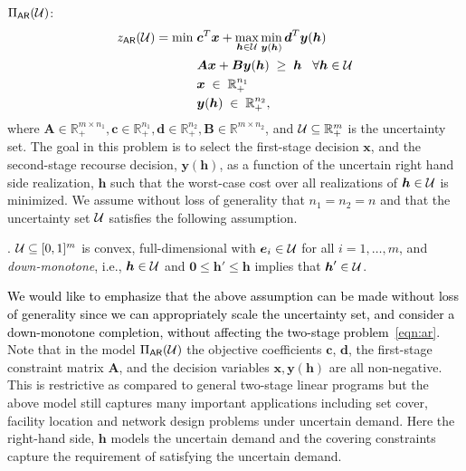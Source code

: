 \documentclass[11pt]{article}
\theoremstyle{plain}
\theoremstyle{definition}
\numberwithin{equation}{section}%
\numberwithin{equation}{section}%
\newcommand{\mb}[1]{\ensuremath{\boldsymbol{#1}}}
\newcommand*{\red}{\textcolor{black}}
\begin{document}
\medskip

\noindent
$\Pi_{\sf AR}({\cal U})$:
\begin{equation}\label{eqn:ar}
\begin{aligned}
z_{\sf AR}({\cal U}) = \min \; & \mb{c}^T \mb{x} + \max_{\mb{h}\in {\cal U}} \min_{\mb{y}(\mb{h})} \mb{d}^T \mb{y}(\mb{h}) \\
&  \mb{A}\mb{x} + \mb{B}\mb{y}(\mb{h}) \; \geq \; \mb{h}   \; \; \; \forall \mb h \in {\cal U}  \\
 & \mb{x} \; \in \; {\mathbb R}^{n_1}_+\\
 & \mb{y}(\mb{h})  \; \in \; {\mathbb R}^{n_2}_+,
\end{aligned}
\end{equation}
where $\mb{A} \in {\mathbb R}_+^{m {\times} n_1}, \mb{c}\in {\mathbb R}^{n_1}_+, \mb{d}\in {\mathbb R}^{n_2}_+, \mb{B} \in {\mathbb R}^{m {\times} n_2}$, and ${\cal U}\subseteq{\mathbb R}^m_+$ is the uncertainty set. The goal in this problem is to select the first-stage decision $\mb{x}$, and the second-stage recourse decision,  $\mb y(\mb{h})$, as a function of the uncertain right hand side realization, $\mb{h}$ such that the worst-case cost over all realizations of $\mb h \in {\cal U}$ is minimized. We assume without loss of generality that $n_1 = n_2 = n$ and that the uncertainty set ${\cal U}$ satisfies the following assumption.

\vspace{2mm}
. ${\cal U}\subseteq [0,1]^m$  is convex, full-dimensional with $\mb{e}_i \in {\cal U}$ for all $i =1,\ldots,m$, and  {\em down-monotone}, i.e.,  $\mb{h}\in{\cal U}$ and $\mb{0}\leq \mb{h}' \leq\mb{h}$ implies that $\mb{h}' \in{\cal U}$.

\vspace{2mm}
\red{ We would like to emphasize that the above assumption can be made without loss of generality since we can appropriately scale the uncertainty set, and consider a down-monotone completion, without affecting the two-stage problem~\eqref{eqn:ar}.} Note that in the model $\Pi_{\sf AR}({\cal U})$ the objective coefficients $\mb{c}$, $\mb{d}$, the first-stage constraint matrix $\mb{A}$, and the decision variables $\mb{x}, \mb{y}(\mb{h})$ are all non-negative. This is restrictive as compared to general two-stage linear programs but the above model still captures many important applications including set cover, facility location and network design problems under uncertain demand. Here the right-hand side, $\mb h$ models the uncertain demand and the covering constraints capture the requirement of satisfying the uncertain demand.
\end{document}
